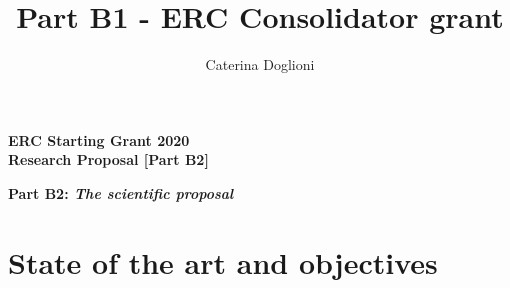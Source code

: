 \documentclass[11pt,a4paper]{article}
\title{{\Large Part B1 - ERC Consolidator grant}}
\author{{\normalsize Caterina Doglioni}}
\date{}                                           %
\begin{document}
\begin{center} 

{\Large\bf ERC Starting Grant 2020} \\
 {\Large\bf Research Proposal [Part B2]}  \\
\vspace{0.5cm} 
\end{center} 

{\Large{\bf Part B2: {\it{The scientific proposal}}}}

\section{State of the art and objectives}
%








\end{document}
